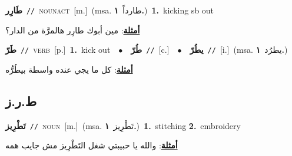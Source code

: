 \documentclass[10pt,a4paper,twoside]{article} %
\begin{document}
\begin{multicols}{2}
{\setlength\topsep{0pt}\textbf{\foreignlanguage{arabic}{طَارِر}}\ {\color{gray}\texttt{//}\color{black}}\ \textsc{noun\textunderscore act}\ [m.]\ \color{gray}(msa. \foreignlanguage{arabic}{طارداً}~\foreignlanguage{arabic}{\textbf{١.}})\color{black}\ \textbf{1.}~kicking sb out\  \begin{flushright}\color{gray}\foreignlanguage{arabic}{\textbf{\underline{\foreignlanguage{arabic}{أمثلة}}}: مين أبوك طارِر هالمرَّة من الدار؟}\end{flushright}\color{black}} \vspace{2mm}

{\setlength\topsep{0pt}\textbf{\foreignlanguage{arabic}{طَرّ}}\ {\color{gray}\texttt{//}\color{black}}\ \textsc{verb}\ [p.]\ \textbf{1.}~kick out\ \ $\bullet$\ \ \setlength\topsep{0pt}\textbf{\foreignlanguage{arabic}{طُرّ}}\ {\color{gray}\texttt{//}\color{black}}\ [c.]\ \ $\bullet$\ \ \setlength\topsep{0pt}\textbf{\foreignlanguage{arabic}{يطُرّ}}\ {\color{gray}\texttt{//}\color{black}}\ [i.]\ \color{gray}(msa. \foreignlanguage{arabic}{يطرُد}~\foreignlanguage{arabic}{\textbf{١.}})\color{black}\  \begin{flushright}\color{gray}\foreignlanguage{arabic}{\textbf{\underline{\foreignlanguage{arabic}{أمثلة}}}: كل ما يجي عنده واسطة بيطُرُّه}\end{flushright}\color{black}} \vspace{2mm}

\vspace{-3mm}
\subsection*{\color{blue}\foreignlanguage{arabic}{ط.ر.ز}\color{blue}{}} 

{\setlength\topsep{0pt}\textbf{\foreignlanguage{arabic}{تَطْرِيز}}\ {\color{gray}\texttt{//}\color{black}}\ \textsc{noun}\ [m.]\ \color{gray}(msa. \foreignlanguage{arabic}{تَطْرِيز}~\foreignlanguage{arabic}{\textbf{١.}})\color{black}\ \textbf{1.}~stitching  \textbf{2.}~embroidery\  \begin{flushright}\color{gray}\foreignlanguage{arabic}{\textbf{\underline{\foreignlanguage{arabic}{أمثلة}}}: والله يا حبيبتي شغل التَطْرِيز مش جايب همه}\end{flushright}\color{black}} \vspace{2mm}


\end{multicols}
\end{document}

